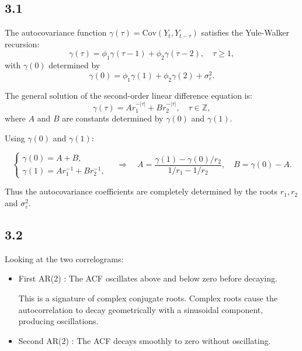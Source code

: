 \documentclass[11pt]{article}
\begin{document}
\begin{solution}  %
\subsection*{3.1}

The autocovariance function \(\gamma(\tau) = \text{Cov}(Y_t, Y_{t-\tau})\) satisfies the Yule-Walker recursion:
\[
\gamma(\tau) = \phi_1 \gamma(\tau-1) + \phi_2 \gamma(\tau-2), \quad \tau \ge 1,
\]
with \(\gamma(0)\) determined by
\[
\gamma(0) = \phi_1 \gamma(1) + \phi_2 \gamma(2) + \sigma_\varepsilon^2.
\]



The general solution of the second-order linear difference equation is:
\[
\gamma(\tau) = A r_1^{-|\tau|} + B r_2^{-|\tau|}, \quad \tau \in \mathbb{Z},
\]
where \(A\) and \(B\) are constants determined by \(\gamma(0)\) and \(\gamma(1)\).



Using \(\gamma(0)\) and \(\gamma(1)\):

\[
\begin{cases}
\gamma(0) = A + B, \\
\gamma(1) = A r_1^{-1} + B r_2^{-1},
\end{cases}
\quad \Rightarrow \quad
A = \frac{\gamma(1) - \gamma(0)/r_2}{1/r_1 - 1/r_2}, \quad
B = \gamma(0) - A.
\]

Thus the autocovariance coefficients are completely determined by the roots \(r_1, r_2\) and \(\sigma_\varepsilon^2\).

\subsection*{3.2}
Looking at the two correlograms:
\begin{itemize}
    \item First AR(2) : The ACF oscillates above and below zero before decaying.
    
    This is a signature of complex conjugate roots. Complex roots cause the autocorrelation to decay geometrically with a sinusoidal component, producing oscillations.
    \item Second AR(2) : The ACF decays smoothly to zero without oscillating.
    

\end{itemize}
\end{solution}
\end{document}
